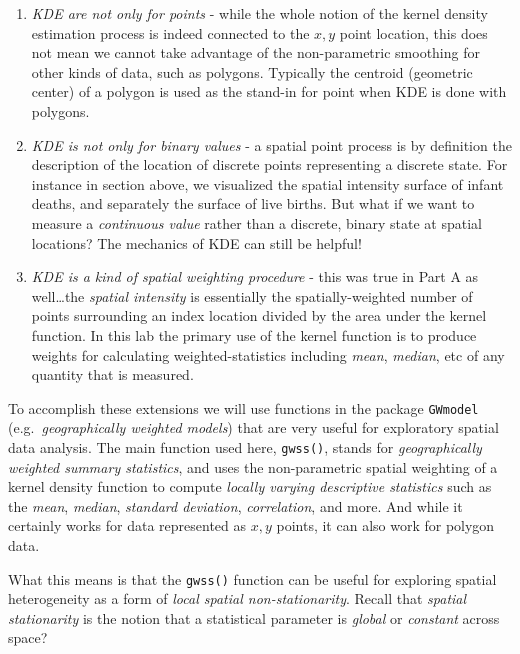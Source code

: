 \documentclass[
]{book}
\providecommand{\tightlist}{%
  \setlength{\itemsep}{0pt}\setlength{\parskip}{0pt}}
\begin{document}
\begin{enumerate}
\def\labelenumi{\arabic{enumi}.}
\tightlist
\item
  \emph{KDE are not only for points} - while the whole notion of the kernel density estimation process is indeed connected to the \(x,y\) point location, this does not mean we cannot take advantage of the non-parametric smoothing for other kinds of data, such as polygons. Typically the centroid (geometric center) of a polygon is used as the stand-in for point when KDE is done with polygons.
\item
  \emph{KDE is not only for binary values} - a spatial point process is by definition the description of the location of discrete points representing a discrete state. For instance in section above, we visualized the spatial intensity surface of infant deaths, and separately the surface of live births. But what if we want to measure a \emph{continuous value} rather than a discrete, binary state at spatial locations? The mechanics of KDE can still be helpful!
\item
  \emph{KDE is a kind of spatial weighting procedure} - this was true in Part A as well\ldots the \emph{spatial intensity} is essentially the spatially-weighted number of points surrounding an index location divided by the area under the kernel function. In this lab the primary use of the kernel function is to produce weights for calculating weighted-statistics including \emph{mean}, \emph{median}, etc of any quantity that is measured.
\end{enumerate}

To accomplish these extensions we will use functions in the package \texttt{GWmodel} (e.g.~\emph{geographically weighted models}) that are very useful for exploratory spatial data analysis. The main function used here, \texttt{gwss()}, stands for \emph{geographically weighted summary statistics}, and uses the non-parametric spatial weighting of a kernel density function to compute \emph{locally varying descriptive statistics} such as the \emph{mean}, \emph{median}, \emph{standard deviation}, \emph{correlation}, and more. And while it certainly works for data represented as \(x,y\) points, it can also work for polygon data.

What this means is that the \texttt{gwss()} function can be useful for exploring spatial heterogeneity as a form of \emph{local spatial non-stationarity}. Recall that \emph{spatial stationarity} is the notion that a statistical parameter is \emph{global} or \emph{constant} across space?
\end{document}

